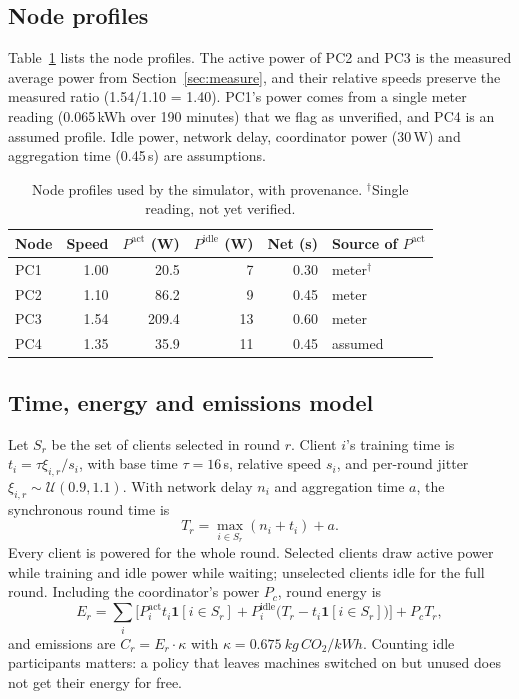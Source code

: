 \documentclass[conference]{IEEEtran}
\begin{document}
\subsection{Node profiles}

Table~\ref{tab:profiles} lists the node profiles. The active power of PC2 and PC3 is the measured average power from Section~\ref{sec:measure}, and their relative speeds preserve the measured ratio (1.54/1.10 = 1.40). PC1's power comes from a single meter reading (0.065\,kWh over 190 minutes) that we flag as unverified, and PC4 is an assumed profile. Idle power, network delay, coordinator power (30\,W) and aggregation time (0.45\,s) are assumptions.

\begin{table}[t]
\centering
\caption{Node profiles used by the simulator, with provenance. $^{\dagger}$Single reading, not yet verified.}
\label{tab:profiles}
\small\setlength{\tabcolsep}{4pt}
\begin{tabular}{@{}lrrrrl@{}}
\toprule
Node & Speed & $P^{\mathrm{act}}$ (W) & $P^{\mathrm{idle}}$ (W) & Net (s) & Source of $P^{\mathrm{act}}$ \\
\midrule
PC1 & 1.00 & 20.5 & 7 & 0.30 & meter$^{\dagger}$ \\
PC2 & 1.10 & 86.2 & 9 & 0.45 & meter \\
PC3 & 1.54 & 209.4 & 13 & 0.60 & meter \\
PC4 & 1.35 & 35.9 & 11 & 0.45 & assumed \\
\bottomrule
\end{tabular}
\end{table}

\subsection{Time, energy and emissions model}

Let $S_r$ be the set of clients selected in round $r$. Client $i$'s training time is $t_i = \tau \xi_{i,r}/s_i$, with base time $\tau{=}16$\,s, relative speed $s_i$, and per-round jitter $\xi_{i,r}\sim\mathcal{U}(0.9,1.1)$. With network delay $n_i$ and aggregation time $a$, the synchronous round time is
\begin{equation}
T_r = \max_{i\in S_r}\left(n_i + t_i\right) + a .
\end{equation}
Every client is powered for the whole round. Selected clients draw active power while training and idle power while waiting; unselected clients idle for the full round. Including the coordinator's power $P_c$, round energy is
\begin{equation}
E_r = \sum_{i} \Big[P_i^{\mathrm{act}} t_i \mathbf{1}[i\in S_r] + P_i^{\mathrm{idle}}\big(T_r - t_i \mathbf{1}[i\in S_r]\big)\Big] + P_c T_r ,
\end{equation}
and emissions are $C_r = E_r \cdot \kappa$ with $\kappa = \SI{0.675}{kg\,CO_2/kWh}$. Counting idle participants matters: a policy that leaves machines switched on but unused does not get their energy for free.
\end{document}
